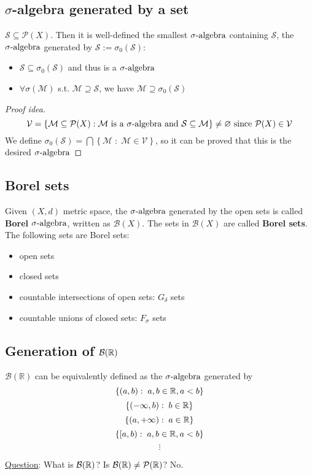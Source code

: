 \subsection{\texorpdfstring{\(\sigma\)}{sigma}-algebra generated by a set}
\begin{theorem}
    \(\mathcal{S} \subseteq \mathcal{P}(X)\). Then it is well-defined the smallest \(\sigma\mbox{-algebra}\) containing \(\mathcal{S}\), the \(\sigma\mbox{-algebra}\) generated by \(\mathcal{S} := \sigma_0(\mathcal{S})\):
    \begin{itemize}
        \item \(\mathcal{S} \subseteq \sigma_0(\mathcal{S})\) and thus is a \(\sigma\mbox{-algebra}\)
        \item \(\forall \sigma(\mathcal{M})\) s.t. \(\mathcal{M} \supseteq \mathcal{S}\), we have \(\mathcal{M} \supseteq \sigma_0(\mathcal{S})\)
    \end{itemize}
\end{theorem}
\begin{proof}[Proof idea]
    \[
        \mathcal{V} = \left\lbrace \mathcal{M} \subseteq \mathcal{P}(X): \mathcal{M} \mbox{ is a } \sigma\mbox{-algebra} \mbox{ and }\mathcal{S} \subseteq \mathcal{M}\right\rbrace \not = \varnothing \mbox{ since } \mathcal{P}(X) \in \mathcal{V}
    \]
    We define \(\sigma_0(\mathcal{S}) = \bigcap \left\lbrace \mathcal{M} \; : \; \mathcal{M} \in \mathcal{V}\right\rbrace\), so it can be proved that this is the desired \(\sigma\mbox{-algebra}\)
\end{proof}
\subsection{Borel sets}
Given \((X, d)\) metric space, the \(\sigma\mbox{-algebra}\) generated by the open sets is called \textbf{Borel} \(\sigma\mbox{-algebra}\), written as \(\mathcal{B}(X)\). The sets in \(\mathcal{B}(X)\) are called \textbf{Borel sets}. The following sets are Borel sets:
\begin{itemize}
    \item open sets
    \item closed sets
    \item countable intersections of open sets: \(G_{\delta}\) sets
    \item countable unions of closed sets: \(F_{\sigma}\) sets
\end{itemize}
\subsection{Generation of \texorpdfstring{\(\mathcal{B}(\mathbb{R})\)}{B(R)}}
\begin{remark}
    \(\mathcal{B}(\mathbb{R})\) can be equivalently defined as the \(\sigma\mbox{-algebra}\) generated by 
    \[
        \left\lbrace (a,b): \; a,b \in \mathbb{R}, a < b \right\rbrace
    \]
    \[
        \left\lbrace (-\infty,b): \; b \in \mathbb{R} \right\rbrace
    \]
    \[
        \left\lbrace (a,+\infty ): \; a \in \mathbb{R} \right\rbrace
    \]
    \[
        \left\lbrace [a,b): \; a,b \in \mathbb{R}, a < b \right\rbrace
    \]
    \[
        \vdots
    \]
\end{remark}
\noindent\underline{Question}: What is \(\mathcal{B}(\mathbb{R})\)?
Is \(\mathcal{B}(\mathbb{R}) \not = \mathcal{P}(\mathbb{R})\)? No.
